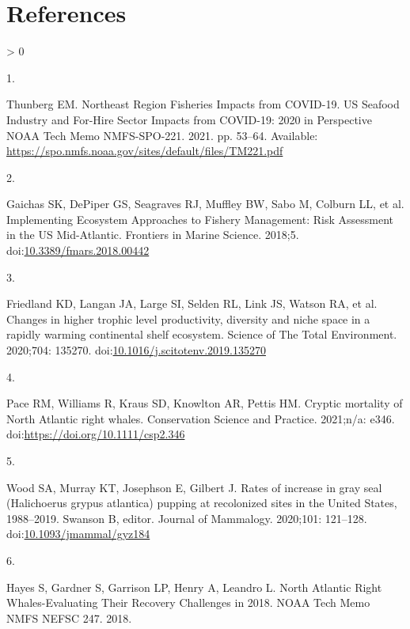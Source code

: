 \documentclass[
  10pt,
]{article}
\newlength{\cslhangindent}
\newlength{\csllabelwidth}
\newenvironment{CSLReferences}[2] %
 {%
  \setlength{\parindent}{0pt}
  \ifodd #1 \everypar{\setlength{\hangindent}{\cslhangindent}}\ignorespaces\fi
  \ifnum #2 > 0
  \setlength{\parskip}{#2\baselineskip}
  \fi
 }%
 {}
\newcommand{\CSLLeftMargin}[1]{\parbox[t]{\csllabelwidth}{#1}}
\newcommand{\CSLRightInline}[1]{\parbox[t]{\linewidth - \csllabelwidth}{#1}\break}
\begin{document}
\newpage

\hypertarget{references}{%
\section*{References}\label{references}}

\hypertarget{refs}{}
\begin{CSLReferences}{0}{0}
\leavevmode\hypertarget{ref-thunberg_northeast_2021}{}%
\CSLLeftMargin{1. }
\CSLRightInline{Thunberg EM. Northeast {Region} {Fisheries} {Impacts}
from {COVID}-19. U{S} {Seafood} {Industry} and {For}-{Hire} {Sector}
{Impacts} from {COVID}-19: 2020 in {Perspective} {NOAA} {Tech} {Memo}
{NMFS}-{SPO}-221. 2021. pp. 53--64. Available:
\url{https://spo.nmfs.noaa.gov/sites/default/files/TM221.pdf}}

\leavevmode\hypertarget{ref-gaichas_implementing_2018}{}%
\CSLLeftMargin{2. }
\CSLRightInline{Gaichas SK, DePiper GS, Seagraves RJ, Muffley BW, Sabo
M, Colburn LL, et al. Implementing {Ecosystem} {Approaches} to {Fishery}
{Management}: {Risk} {Assessment} in the {US} {Mid}-{Atlantic}.
Frontiers in Marine Science. 2018;5.
doi:\href{https://doi.org/10.3389/fmars.2018.00442}{10.3389/fmars.2018.00442}}

\leavevmode\hypertarget{ref-friedland_changes_2020}{}%
\CSLLeftMargin{3. }
\CSLRightInline{Friedland KD, Langan JA, Large SI, Selden RL, Link JS,
Watson RA, et al. Changes in higher trophic level productivity,
diversity and niche space in a rapidly warming continental shelf
ecosystem. Science of The Total Environment. 2020;704: 135270.
doi:\href{https://doi.org/10.1016/j.scitotenv.2019.135270}{10.1016/j.scitotenv.2019.135270}}

\leavevmode\hypertarget{ref-pace_cryptic_2021}{}%
\CSLLeftMargin{4. }
\CSLRightInline{Pace RM, Williams R, Kraus SD, Knowlton AR, Pettis HM.
Cryptic mortality of {North} {Atlantic} right whales. Conservation
Science and Practice. 2021;n/a: e346.
doi:\url{https://doi.org/10.1111/csp2.346}}

\leavevmode\hypertarget{ref-wood_rates_2020}{}%
\CSLLeftMargin{5. }
\CSLRightInline{Wood SA, Murray KT, Josephson E, Gilbert J. Rates of
increase in gray seal ({Halichoerus} grypus atlantica) pupping at
recolonized sites in the {United} {States}, 1988--2019. Swanson B,
editor. Journal of Mammalogy. 2020;101: 121--128.
doi:\href{https://doi.org/10.1093/jmammal/gyz184}{10.1093/jmammal/gyz184}}

\leavevmode\hypertarget{ref-hayes_north_2018}{}%
\CSLLeftMargin{6. }
\CSLRightInline{Hayes S, Gardner S, Garrison LP, Henry A, Leandro L.
North {Atlantic} {Right} {Whales}-{Evaluating} {Their} {Recovery}
{Challenges} in 2018. {NOAA} {Tech} {Memo} {NMFS} {NEFSC} 247. 2018. }


\end{CSLReferences}
\end{document}
